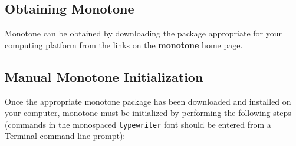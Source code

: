 \documentclass[12pt]{article}
\begin{document}
\subsection*{Obtaining Monotone}
Monotone can be obtained by downloading the package appropriate for your computing platform from the links on the \href{http://monotone.ca/}{\bf monotone} home page.


\subsection*{Manual Monotone Initialization}

Once the appropriate monotone package has been downloaded and installed on your computer, monotone must be initialized by performing the following steps (commands in the monospaced {\tt typewriter} font should be entered from a Terminal command line prompt):
\end{document}
